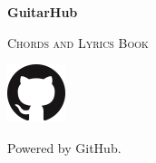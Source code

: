 
\begin{titlepage}
	\centering
	{\sffamily\huge\bfseries GuitarHub\par}
	{\ttfamily\scshape\Large Chords and Lyrics Book\par}
	\vfill
	\includegraphics[scale=1]{img/GitHub-Mark/PNG/GitHub-Mark-64px.png}\par %
	Powered by GitHub.\par
\end{titlepage}

